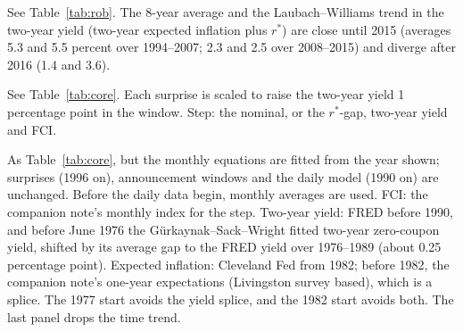 \documentclass[11pt]{article}
\newcommand{\rs}{r^{*}}
\begin{document}
\begin{table}[H]\centering\small
\caption{Different adjustments of the two-year yield: core PCE price level (percent)}\label{tab:robp}
{\setlength{\tabcolsep}{4pt}\resizebox{\ifdim\width>\linewidth\linewidth\else\width\fi}{!}{}}
\par\smallskip\begin{minipage}{0.95\textwidth}\footnotesize See Table~\ref{tab:rob}. The 8-year average and the Laubach--Williams trend in the two-year yield (two-year expected inflation plus $\rs$) are close until 2015 (averages 5.3 and 5.5 percent over 1994--2007; 2.3 and 2.5 over 2008--2015) and diverge after 2016 (1.4 and 3.6).\end{minipage}
\end{table}
\begin{table}[H]\centering\small
\caption{Other surprise measures, with the FCI}\label{tab:shocks}
{\setlength{\tabcolsep}{4pt}\resizebox{\ifdim\width>\linewidth\linewidth\else\width\fi}{!}{}}
\par\smallskip\begin{minipage}{0.95\textwidth}\footnotesize See Table~\ref{tab:core}. Each surprise is scaled to raise the two-year yield 1 percentage point in the window. Step: the nominal, or the $\rs$-gap, two-year yield and FCI.\end{minipage}
\end{table}
\begin{table}[H]\centering\small
\caption{Unemployment response with the monthly equations estimated on longer samples}\label{tab:longu}
{\setlength{\tabcolsep}{4pt}\resizebox{\ifdim\width>\linewidth\linewidth\else\width\fi}{!}{}}
\par\smallskip\begin{minipage}{0.95\textwidth}\footnotesize As Table~\ref{tab:core}, but the monthly equations are fitted from the year shown; surprises (1996 on), announcement windows and the daily model (1990 on) are unchanged. Before the daily data begin, monthly averages are used. FCI: the companion note's monthly index for the step. Two-year yield: FRED before 1990, and before June 1976 the Gürkaynak--Sack--Wright fitted two-year zero-coupon yield, shifted by its average gap to the FRED yield over 1976--1989 (about 0.25 percentage point). Expected inflation: Cleveland Fed from 1982; before 1982, the companion note's one-year expectations (Livingston survey based), which is a splice. The 1977 start avoids the yield splice, and the 1982 start avoids both. The last panel drops the time trend.\end{minipage}
\end{table}
\end{document}

